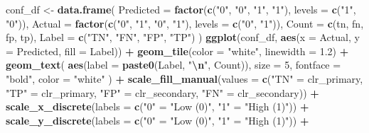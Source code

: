 \documentclass[
]{article}
\newenvironment{Shaded}{\begin{snugshade}}{\end{snugshade}}
\newcommand{\AttributeTok}[1]{\textcolor[rgb]{0.13,0.29,0.53}{#1}}
\newcommand{\DecValTok}[1]{\textcolor[rgb]{0.00,0.00,0.81}{#1}}
\newcommand{\FloatTok}[1]{\textcolor[rgb]{0.00,0.00,0.81}{#1}}
\newcommand{\FunctionTok}[1]{\textcolor[rgb]{0.13,0.29,0.53}{\textbf{#1}}}
\newcommand{\NormalTok}[1]{#1}
\newcommand{\OtherTok}[1]{\textcolor[rgb]{0.56,0.35,0.01}{#1}}
\newcommand{\SpecialCharTok}[1]{\textcolor[rgb]{0.81,0.36,0.00}{\textbf{#1}}}
\newcommand{\StringTok}[1]{\textcolor[rgb]{0.31,0.60,0.02}{#1}}
\begin{document}
\begin{Shaded}
\begin{Highlighting}[]
\NormalTok{conf\_df }\OtherTok{\textless{}{-}} \FunctionTok{data.frame}\NormalTok{(}
  \AttributeTok{Predicted =} \FunctionTok{factor}\NormalTok{(}\FunctionTok{c}\NormalTok{(}\StringTok{"0"}\NormalTok{, }\StringTok{"0"}\NormalTok{, }\StringTok{"1"}\NormalTok{, }\StringTok{"1"}\NormalTok{), }\AttributeTok{levels =} \FunctionTok{c}\NormalTok{(}\StringTok{"1"}\NormalTok{, }\StringTok{"0"}\NormalTok{)),}
  \AttributeTok{Actual =} \FunctionTok{factor}\NormalTok{(}\FunctionTok{c}\NormalTok{(}\StringTok{"0"}\NormalTok{, }\StringTok{"1"}\NormalTok{, }\StringTok{"0"}\NormalTok{, }\StringTok{"1"}\NormalTok{), }\AttributeTok{levels =} \FunctionTok{c}\NormalTok{(}\StringTok{"0"}\NormalTok{, }\StringTok{"1"}\NormalTok{)),}
  \AttributeTok{Count =} \FunctionTok{c}\NormalTok{(tn, fn, fp, tp),}
  \AttributeTok{Label =} \FunctionTok{c}\NormalTok{(}\StringTok{"TN"}\NormalTok{, }\StringTok{"FN"}\NormalTok{, }\StringTok{"FP"}\NormalTok{, }\StringTok{"TP"}\NormalTok{)}
\NormalTok{)}
\FunctionTok{ggplot}\NormalTok{(conf\_df, }\FunctionTok{aes}\NormalTok{(}\AttributeTok{x =}\NormalTok{ Actual, }\AttributeTok{y =}\NormalTok{ Predicted, }\AttributeTok{fill =}\NormalTok{ Label)) }\SpecialCharTok{+}
  \FunctionTok{geom\_tile}\NormalTok{(}\AttributeTok{color =} \StringTok{"white"}\NormalTok{, }\AttributeTok{linewidth =} \FloatTok{1.2}\NormalTok{) }\SpecialCharTok{+}
  \FunctionTok{geom\_text}\NormalTok{(}
    \FunctionTok{aes}\NormalTok{(}\AttributeTok{label =} \FunctionTok{paste0}\NormalTok{(Label, }\StringTok{"}\SpecialCharTok{\textbackslash{}n}\StringTok{"}\NormalTok{, Count)),}
    \AttributeTok{size =} \DecValTok{5}\NormalTok{,}
    \AttributeTok{fontface =} \StringTok{"bold"}\NormalTok{,}
    \AttributeTok{color =} \StringTok{"white"}
\NormalTok{  ) }\SpecialCharTok{+}
\FunctionTok{scale\_fill\_manual}\NormalTok{(}\AttributeTok{values =} \FunctionTok{c}\NormalTok{(}\StringTok{"TN"} \OtherTok{=}\NormalTok{ clr\_primary, }\StringTok{"TP"} \OtherTok{=}\NormalTok{ clr\_primary,}
                             \StringTok{"FP"} \OtherTok{=}\NormalTok{ clr\_secondary, }\StringTok{"FN"} \OtherTok{=}\NormalTok{ clr\_secondary)) }\SpecialCharTok{+}
  \FunctionTok{scale\_x\_discrete}\NormalTok{(}\AttributeTok{labels =} \FunctionTok{c}\NormalTok{(}\StringTok{"0"} \OtherTok{=} \StringTok{"Low (0)"}\NormalTok{, }\StringTok{"1"} \OtherTok{=} \StringTok{"High (1)"}\NormalTok{)) }\SpecialCharTok{+}
  \FunctionTok{scale\_y\_discrete}\NormalTok{(}\AttributeTok{labels =} \FunctionTok{c}\NormalTok{(}\StringTok{"0"} \OtherTok{=} \StringTok{"Low (0)"}\NormalTok{, }\StringTok{"1"} \OtherTok{=} \StringTok{"High (1)"}\NormalTok{)) }\SpecialCharTok{+}

\end{Highlighting}
\end{Shaded}
\end{document}
